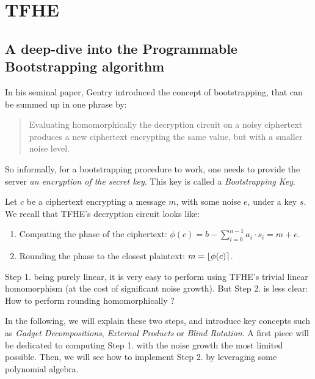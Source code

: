 
\chapter{TFHE}






\section{A deep-dive into the Programmable Bootstrapping algorithm}

In his seminal paper, Gentry introduced the concept of bootstrapping, that can be summed up in one phrase by:

\begin{quote}
	Evaluating homomorphically the decryption circuit on a noisy ciphertext produces a new ciphertext encrypting the same value, but with a smaller noise level.
\end{quote}

So informally, for a bootstrapping procedure to work, one needs to provide the server \textit{an encryption of the secret key}. This key is called a \textit{Bootstrapping Key}.



Let $c$ be a ciphertext encrypting a message $m$, with some noise $e$, under a key $s$. We recall that TFHE's decryption circuit looks like:

\begin{enumerate}
	\item Computing the phase of the ciphertext: $\phi(c) = b - \sum_{i=0}^{n-1} a_i \cdot s_i = m + e$.
	\item Rounding the phase to the closest plaintext: $m = \left \lfloor \phi(c) \right \rceil$.
\end{enumerate}


Step 1. being purely linear, it is very easy to perform using TFHE's trivial linear homomorphism (at the cost of significant noise growth). But Step 2. is less clear: How to perform rounding homomorphically ? 

In the following, we will explain these two steps, and introduce key concepts such as \textit{Gadget Decompositions}, \textit{External Products} or \textit{Blind Rotation}. A first piece will be dedicated to computing Step 1. with the noise growth the most limited possible. Then, we will see how to implement Step 2. by leveraging some polynomial algebra.

